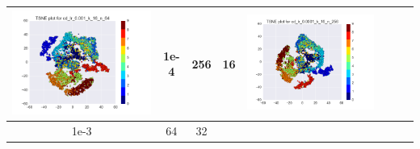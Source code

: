 \documentclass[12pt]{report}
\begin{document}
\begin{table}[H]
\begin{tabular}{ | c | c | c | c || c | c | c| c |}
\begin{minipage}{.3\textwidth}
      \includegraphics[scale=0.25]{cd_lr_0_001_k_16_n_64.png}
    \end{minipage}
	&
    1e-4 & 256 & 16 &
    \begin{minipage}{.3\textwidth}
      \includegraphics[scale=0.25]{cd_lr_0_0001_k_16_n_256.png}
    \end{minipage}
    \\ \hline
    1e-3 & 64 & 32 &
    \begin{minipage}{.3\textwidth}

\end{minipage}
\end{tabular}
\end{table}
\end{document}
